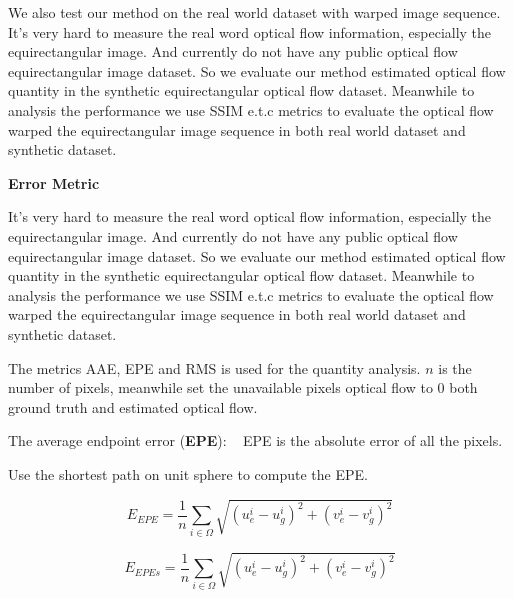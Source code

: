We also test our method on the real world dataset with warped image sequence.
It's very hard to measure the real word optical flow information, especially the equirectangular image. 
And currently do not have any public optical flow equirectangular image dataset.
So we evaluate our method estimated optical flow quantity in the synthetic equirectangular optical flow dataset.
Meanwhile to analysis the performance we use SSIM e.t.c metrics to evaluate the optical flow warped the equirectangular image sequence in both real world dataset and synthetic dataset.




\textbf{Error Metric}

It's very hard to measure the real word optical flow information, especially the equirectangular image. 
And currently do not have any public optical flow equirectangular image dataset.
So we evaluate our method estimated optical flow quantity in the synthetic equirectangular optical flow dataset.
Meanwhile to analysis the performance we use SSIM e.t.c metrics to evaluate the optical flow warped the equirectangular image sequence in both real world dataset and synthetic dataset.

The metrics AAE, EPE and RMS is used for the quantity analysis.
$n$ is the number of pixels, meanwhile set the unavailable pixels optical flow to 0 both ground truth and estimated optical flow.

The average endpoint error (\textbf{EPE}):  ~\cite{FlowEvalIJCV2011}
EPE is the absolute error of all the pixels.

Use the shortest path on unit sphere to compute the EPE.

\begin{equation}\label{equ_exp_epe}
	E_{EPE} = \frac{1}{n} \sum_{i \in \Omega}\sqrt{(u_e^i - u_g^i)^2 + (v_e^i - v_g^i)^2}
\end{equation}

\begin{equation}\label{equ_exp_epe_sp}
	E_{EPEs} = \frac{1}{n} \sum_{i \in \Omega}\sqrt{(u_e^i - u_g^i)^2 + (v_e^i - v_g^i)^2}
\end{equation}

